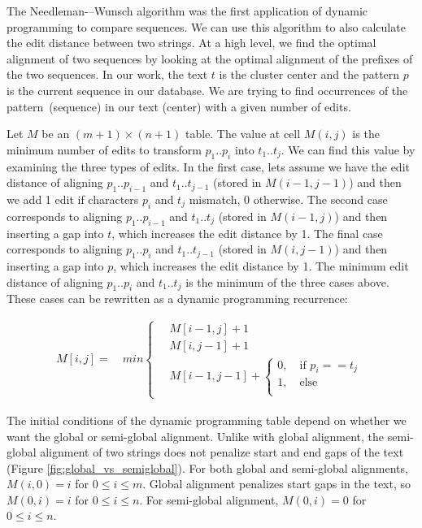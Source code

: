 The Needleman-–Wunsch\cite{needleman_general_1970} algorithm was the first application of dynamic programming to compare sequences.
We can use this algorithm to also calculate the edit distance between two strings.
At a high level, we find the optimal alignment of two sequences by looking at the optimal alignment of the prefixes of the two sequences.
In our work, the text $t$ is the cluster center and the pattern $p$ is the current sequence in our database.
We are trying to find occurrences of the pattern (sequence) in our text (center) with a given number of edits.

Let $M$ be an $(m+1) \times (n+1)$ table.  The value at cell $M(i,j)$ is the minimum number of edits to transform $p_1..p_i$ into $t_1..t_j$.
We can find this value by examining the three types of edits.
In the first case, lets assume we have the edit distance of aligning $p_1..p_{i-1}$ and $t_1..t_{j-1}$ (stored in $M(i-1,j-1)$) and then we add 1 edit if characters $p_i$ and $t_j$ mismatch, 0 otherwise.
The second case corresponds to aligning $p_1..p_{i-1}$ and $t_1..t_{j}$ (stored in $M(i-1,j)$) and then inserting a gap into $t$, which increases the edit distance by 1.
The final case corresponds to aligning $p_1..p_{i}$ and $t_1..t_{j-1}$ (stored in $M(i,j-1)$) and then inserting a gap into $p$, which increases the edit distance by 1.
The minimum edit distance of aligning $p_1..p_i$ and $t_1..t_j$ is the minimum of the three cases above.  These cases can be rewritten as a dynamic programming recurrence:

\begin{equation}
\begin{aligned}
M[i, j] = \quad min
\begin{cases}
\quad M[i - 1, j] + 1 \\
\quad M[i, j-1] + 1 \\
\quad M[i-1, j-1] + \begin{cases} 
0, \quad \text{if }p_i == t_j \\
1, \quad \text{else } \\
\end{cases}
\end{cases}
\end{aligned}
\end{equation}

The initial conditions of the dynamic programming table depend on whether we want the global or semi-global alignment.
Unlike with global alignment, the semi-global alignment of two strings does not penalize start and end gaps of the text (Figure \ref{fig:global_vs_semiglobal}).
For both global and semi-global alignments, $M(i,0) = i$ for $0 \leq i \leq m$.
Global alignment penalizes start gaps in the text, so $M(0,i) = i$ for $0 \leq i \leq n$.
For semi-global alignment, $M(0,i) = 0$ for $0 \leq i \leq n$.

